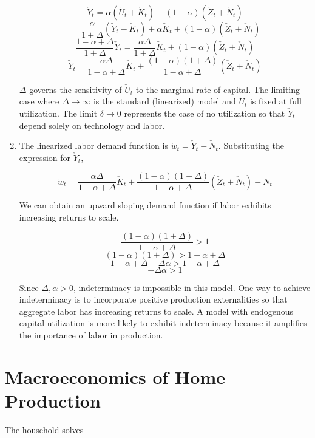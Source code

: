 \documentclass[11pt]{article}
\begin{document}
\begin{enumerate}
            $$ \check Y_t = \alpha (\check U_t + \check K_t) + (1-\alpha) (\check Z_t + \check N_t) $$
            $$ = \frac{\alpha}{1+\Delta} (\check Y_t - \check K_t) + \alpha \check K_t + (1-\alpha) (\check Z_t + \check N_t) $$
            $$ \frac{1-\alpha+\Delta}{1+\Delta} \check Y_t = \frac{\alpha \Delta}{1+\Delta} \check K_t + (1-\alpha) (\check Z_t + \check N_t) $$
            $$ \check Y_t = \frac{\alpha \Delta}{1-\alpha+\Delta} \check K_t + \frac{(1-\alpha) (1+\Delta)}{1-\alpha+\Delta} (\check Z_t + \check N_t) $$

        $\Delta$ governs the sensitivity of $\check U_t$ to the marginal rate of capital. The limiting case where $\Delta \to \infty$ is the standard (linearized) model and $\check U_t$ is fixed at full utilization. The limit $\delta \to 0$ represents the case of no utilization so that $\check Y_t$ depend solely on technology and labor.

        \item The linearized labor demand function is $\check w_t = \check Y_t - \check N_t$. Substituting the expression for $\check Y_t$,

            $$ \check w_t = \frac{\alpha \Delta}{1-\alpha+\Delta} \check K_t + \frac{(1-\alpha) (1+\Delta)}{1-\alpha+\Delta} (\check Z_t + \check N_t) - N_t $$

        We can obtain an upward sloping demand function if labor exhibits increasing returns to scale.

            $$ \frac{(1-\alpha) (1+\Delta)}{1-\alpha+\Delta} > 1 $$
            $$ (1-\alpha) (1+\Delta) > 1 - \alpha + \Delta $$
            $$ 1 - \alpha + \Delta - \Delta \alpha > 1 - \alpha + \Delta $$
            $$ - \Delta \alpha > 1 $$

        Since $\Delta, \alpha > 0$, indeterminacy is impossible in this model. One way to achieve indeterminacy is to incorporate positive production externalities so that aggregate labor has increasing returns to scale. A model with endogenous capital utilization is more likely to exhibit indeterminacy because it amplifies the importance of labor in production.

    \end{enumerate}

\section{Macroeconomics of Home Production}

    The household solves
\end{document}
